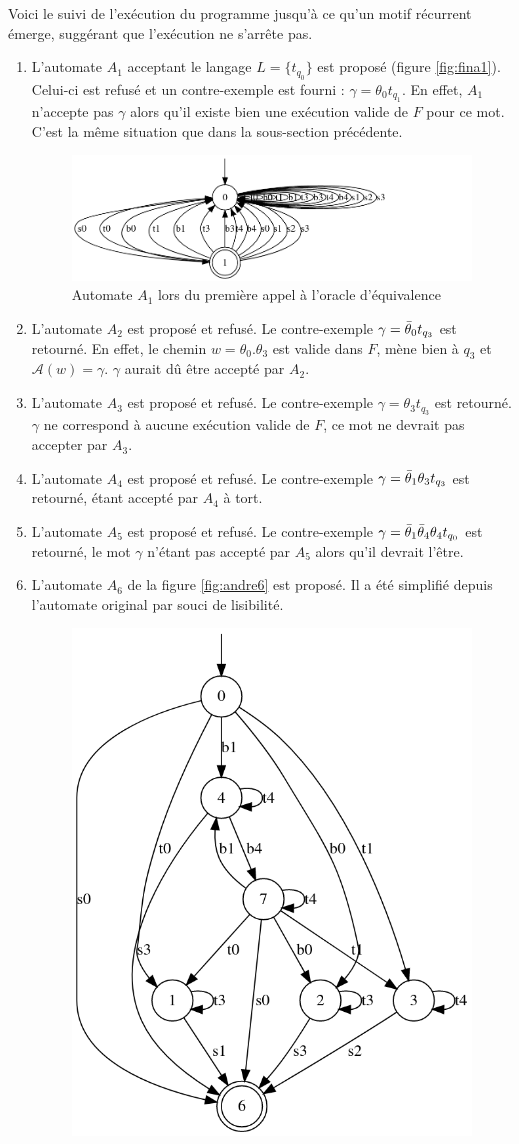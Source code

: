 Voici le suivi de l'exécution du programme jusqu'à ce qu'un motif récurrent émerge, suggérant que l'exécution ne s'arrête pas.

\begin{enumerate}
  \item L'automate $A_1$ acceptant le langage $L=\{t_{q_0}\}$ est proposé (figure \ref{fig:fina1}). Celui-ci est refusé et un contre-exemple est fourni : $\gamma=\theta_0 t_{q_1}$. En effet, $A_1$ n'accepte pas $\gamma$ alors qu'il existe bien une exécution valide de $F$ pour ce mot. C'est la même situation que dans la sous-section précédente.
  \begin{figure}[H]
    \centering
    \includegraphics[width=0.6\linewidth]{res/andre_0}
    \caption{Automate $A_1$ lors du première appel à l'oracle d'équivalence}\label{fig:andre0}
  \end{figure}
  \item L'automate $A_2$ est proposé et refusé. Le contre-exemple $\gamma=\bar{\theta}_0 t_{q_3}$ est retourné. En effet, le chemin $w=\theta_0.\theta_3$ est valide dans $F$, mène bien à $q_3$ et $\mathcal{A}(w)=\gamma$. $\gamma$ aurait dû être accepté par $A_2$.
  \item L'automate $A_3$ est proposé et refusé. Le contre-exemple $\gamma=\theta_3 t_{q_3}$ est retourné. $\gamma$ ne correspond à aucune exécution valide de $F$, ce mot ne devrait pas accepter par $A_3$.
  \item L'automate $A_4$ est proposé et refusé. Le contre-exemple $\gamma=\bar{\theta}_1\theta_3 t_{q_3}$ est retourné, étant accepté par $A_4$ à tort.
  \item L'automate $A_5$ est proposé et refusé. Le contre-exemple $\gamma=\bar{\theta}_1\bar{\theta}_4\theta_4 t_{q_0}$ est retourné, le mot $\gamma$ n'étant pas accepté par $A_5$ alors qu'il devrait l'être.
  \item L'automate $A_6$ de la figure \ref{fig:andre6} est proposé. Il a été simplifié depuis l'automate original par souci de lisibilité.
  \begin{figure}[H]
    \centering
    \includegraphics[width=0.4\linewidth]{res/andre_6}

\end{figure}
\end{enumerate}
